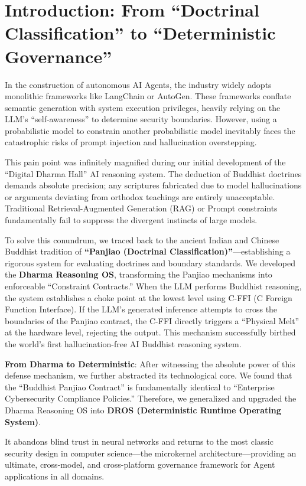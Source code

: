 \documentclass[conference]{IEEEtran}
\begin{document}
\section{Introduction: From ``Doctrinal Classification'' to ``Deterministic Governance''}
In the construction of autonomous AI Agents, the industry widely adopts monolithic frameworks like LangChain or AutoGen. These frameworks conflate semantic generation with system execution privileges, heavily relying on the LLM's ``self-awareness'' to determine security boundaries. However, using a probabilistic model to constrain another probabilistic model inevitably faces the catastrophic risks of prompt injection and hallucination overstepping.

This pain point was infinitely magnified during our initial development of the ``Digital Dharma Hall'' AI reasoning system. The deduction of Buddhist doctrines demands absolute precision; any scriptures fabricated due to model hallucinations or arguments deviating from orthodox teachings are entirely unacceptable. Traditional Retrieval-Augmented Generation (RAG) or Prompt constraints fundamentally fail to suppress the divergent instincts of large models.

To solve this conundrum, we traced back to the ancient Indian and Chinese Buddhist tradition of \textbf{``Panjiao (Doctrinal Classification)''}—establishing a rigorous system for evaluating doctrines and boundary standards. We developed the \textbf{Dharma Reasoning OS}, transforming the Panjiao mechanisms into enforceable ``Constraint Contracts.'' When the LLM performs Buddhist reasoning, the system establishes a choke point at the lowest level using C-FFI (C Foreign Function Interface). If the LLM's generated inference attempts to cross the boundaries of the Panjiao contract, the C-FFI directly triggers a ``Physical Melt'' at the hardware level, rejecting the output. This mechanism successfully birthed the world's first hallucination-free AI Buddhist reasoning system.

\textbf{From Dharma to Deterministic}:
After witnessing the absolute power of this defense mechanism, we further abstracted its technological core. We found that the ``Buddhist Panjiao Contract'' is fundamentally identical to ``Enterprise Cybersecurity Compliance Policies.'' Therefore, we generalized and upgraded the Dharma Reasoning OS into \textbf{DROS (Deterministic Runtime Operating System)}.

It abandons blind trust in neural networks and returns to the most classic security design in computer science—the microkernel architecture—providing an ultimate, cross-model, and cross-platform governance framework for Agent applications in all domains.
\end{document}
